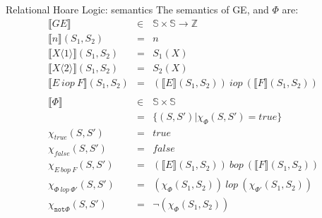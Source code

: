 \documentclass[11pt]{beamer}
\newcommand{\Z}{\mathbb{Z}}
\newcommand{\St}{\mathbb{S}}
\newcommand{\bbracket}[1]{\llbracket #1 \rrbracket}
\newcommand{\chevrons}[1]{\langle #1\rangle}
\begin{document}

\begin{frame}{Relational Hoare Logic: semantics}
The semantics of GE, and $\Phi$ are:\\
$$
\begin{array}{rcl}
\bbracket{GE}& \in & \St\times\St\rightarrow\Z\\
\bbracket{n}(S_1,S_2)& = & n\\
\bbracket{X\chevrons{1}}(S_1,S_2)& = & S_1(X)\\
\bbracket{X\chevrons{2}}(S_1,S_2)& = & S_2(X)\\
\bbracket{E~iop~F}(S_1,S_2)& = & (\bbracket{E}(S_1,S_2))~iop~(\bbracket{F}(S_1,S_2))\\
\\
\bbracket{\Phi}&\in& \St \times \St\\
&=&\{(S,S')|\chi_\Phi(S,S')=true\}\\
\chi_{true}(S,S')&=&true\\
\chi_{false}(S,S')&=&false\\
\chi_{E~bop~F}(S,S')&=&(\bbracket{E}(S_1,S_2))~bop~(\bbracket{F}(S_1,S_2))\\
\chi_{\Phi~lop~\Phi'}(S,S')&=&(\chi_{\Phi}(S_1,S_2))~lop~(\chi_{\Phi'}(S_1,S_2))\\
\chi_{\mathtt{not}\Phi}(S,S')&=&\neg(\chi_{\Phi}(S_1,S_2))\\
\end{array}
$$
\end{frame}
\end{document}
